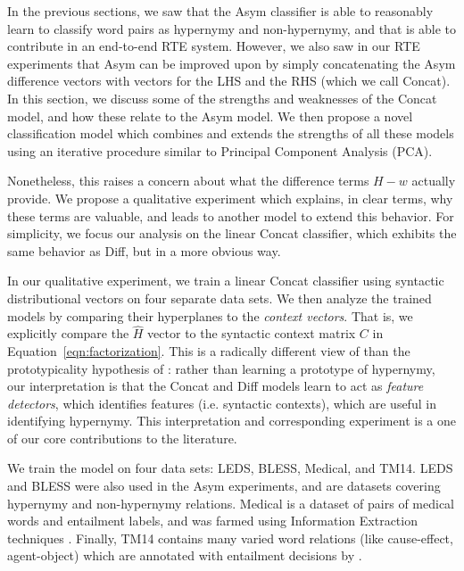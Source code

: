 In the previous sections, we saw that the Asym classifier is able to reasonably
learn to classify word pairs as hypernymy and non-hypernymy, and that is able
to contribute in an end-to-end RTE system. However, we also saw in our
RTE experiments that Asym can be improved upon by simply concatenating the Asym
difference vectors with vectors for the LHS and the RHS (which we call Concat).
In this section, we discuss some of the strengths and weaknesses of the Concat
model, and how these relate to the Asym model. We then propose a novel
classification model which combines and extends the strengths of all these
models using an iterative procedure similar to Principal Component Analysis
(PCA).

Nonetheless, this raises a concern about what the difference terms $H - w$
actually provide. We propose a qualitative experiment which explains, in
clear terms, why these terms are valuable, and leads to another model to
extend this behavior. For simplicity, we focus our analysis on the linear
Concat classifier, which exhibits the same behavior as Diff, but in a
more obvious way.

In our qualitative experiment, we train a linear Concat classifier using
syntactic distributional vectors on four separate data sets. We then analyze
the trained models by comparing their hyperplanes to the {\em context vectors}.
That is, we explicitly compare the $\hat H$ vector to the syntactic context
matrix $C$ in Equation~\ref{eqn:factorization}. This is a radically
different view of than the prototypicality hypothesis of
: rather than learning a prototype of hypernymy, our
interpretation is that the Concat and Diff models learn to act as {\em feature
detectors}, which identifies features (i.e. syntactic contexts), which are
useful in identifying hypernymy.  This interpretation and corresponding
experiment is a one of our core contributions to the literature.

We train the model on four data sets: LEDS, BLESS, Medical, and TM14. LEDS and BLESS
were also used in the Asym experiments, and are datasets covering hypernymy and
non-hypernymy relations. Medical is a dataset of pairs of medical words and
entailment labels, and was farmed using Information Extraction techniques
\cite{levy:2014:conll}. Finally, TM14 contains many varied word relations (like
cause-effect, agent-object) which are annotated with entailment decisions by
.

